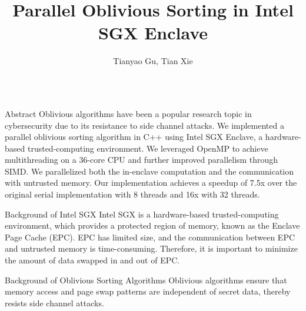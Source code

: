 \documentclass[final,hyperref={pdfpagelabels=false}]{beamer}
\title{Parallel Oblivious Sorting in Intel SGX Enclave}
\author{Tianyao Gu, Tian Xie}
\begin{document}
\begin{frame}
  \begin{columns}[t]

    \begin{column}{.30\linewidth}
      \maketitle
      \begin{block}{Abstract}
        Oblivious algorithms have been a popular research topic in cybersecurity due to its resistance to side channel attacks. We implemented a parallel oblivious sorting algorithm in C++ using Intel SGX Enclave, a hardware-based trusted-computing environment. We leveraged OpenMP to achieve multithreading on a 36-core CPU and further improved parallelism through SIMD. We parallelized both the in-enclave computation and the communication with untrusted memory. Our implementation achieves a speedup of 7.5x over the original serial implementation with 8 threads and 16x with 32 threads.
      \end{block}

      \begin{block}{Background of Intel SGX}
        Intel SGX is a hardware-based trusted-computing environment, which provides a protected region of memory, known as the Enclave Page Cache (EPC). EPC has limited size, and the communication between EPC and untrusted memory is time-consuming. Therefore, it is important to minimize the amount of data swapped in and out of EPC.
      \end{block}

      \begin{block}{Background of Oblivious Sorting Algorithms}
      Oblivious algorithms ensure that memory access and page swap patterns are independent of secret data, thereby resists side channel attacks.
      \end{block}


\end{column}
\end{columns}
\end{frame}
\end{document}
